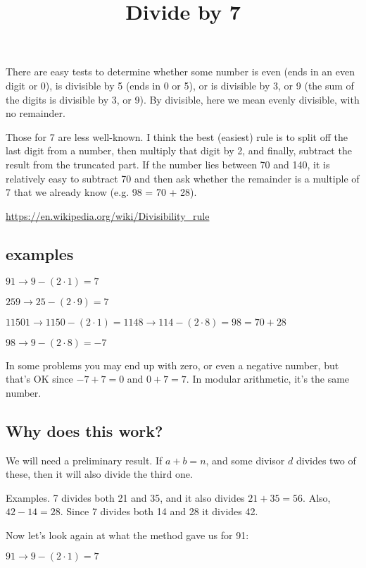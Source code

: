 \documentclass[11pt, oneside]{article}
\title{Divide by 7}
\date{}
\begin{document}
\maketitle
\Large


There are easy tests to determine whether some number is even (ends in an even digit or 0), is divisible by 5 (ends in 0 or 5), or is divisible by 3, or 9 (the sum of the digits is divisible by 3, or 9).  By divisible, here we mean evenly divisible, with no remainder.

Those for 7 are less well-known.  I think the best (easiest) rule is to split off the last digit from a number, then multiply that digit by 2, and finally, subtract the result from the truncated part.  If the number lies between 70 and 140, it is relatively easy to subtract 70 and then ask whether the remainder is a multiple of 7 that we already know (e.g. 98 = 70 + 28).

\url{https://en.wikipedia.org/wiki/Divisibility_rule}

\subsection*{examples}

$91 \rightarrow 9 - (2 \cdot 1) = 7$

$259 \rightarrow 25 - (2 \cdot 9) = 7$

$11501 \rightarrow 1150 - (2 \cdot 1) = 1148 \rightarrow 114 - (2 \cdot 8) = 98 = 70 + 28$

$98 \rightarrow 9 - (2 \cdot 8) = -7$

In some problems you may end up with zero, or even a negative number, but that's OK since $-7 + 7 = 0$ and $0 + 7 = 7$.  In modular arithmetic, it's the same number.

\subsection*{Why does this work?}

We will need a preliminary result.  If $a + b = n$, and some divisor $d$ divides two of these, then it will also divide the third one.

Examples.  7 divides both 21 and 35, and it also divides $21 + 35 = 56$. Also, $42 - 14 = 28$.  Since 7 divides both 14 and 28 it divides 42.

Now let's look again at what the method gave us for 91:

$91 \rightarrow 9 - (2 \cdot 1) = 7$
\end{document}
